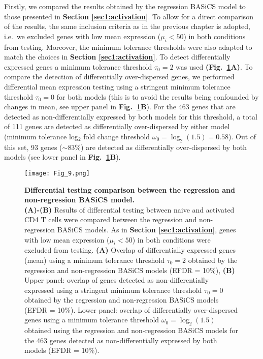 Firstly, we compared the results obtained by the regression BASiCS model to those presented in \textbf{Section \ref{sec1:activation}}.  
To allow for a direct comparison of the results, the same inclusion criteria as in the previous chapter is adopted, i.e.~we excluded genes with low mean expression ($\mu_i<50$) in both conditions from testing. Moreover, the minimum tolerance thresholds were also adapted to match the choices in \textbf{Section \ref{sec1:activation}}. To detect differentially expressed genes a minimum tolerance threshold $\tau_0 = 2$ was used \textbf{(Fig.~\ref{fig2:model_comparison}A)}. To compare the detection of differentially over-dispersed genes, we performed differential mean expression testing using a stringent minimum tolerance threshold $\tau_0 = 0$ for both models (this is to avoid the results being confounded by changes in mean, see upper panel in \textbf{Fig.~\ref{fig2:model_comparison}B}). For the 463 genes that are detected as non-differentially expressed by both models for this threshold, a total of 111 genes are detected as differentially over-dispersed by either model (minimum tolerance log$_2$ fold change threshold $\omega_0 = \log_2(1.5) = 0.58$). Out of this set, 93 genes ($\sim$83\%) are detected as differentially over-dispersed by both models (see lower panel in \textbf{Fig.~\ref{fig2:model_comparison}B}).

\begin{figure}[!h]
\centering
\texttt{[image: Fig\_9.png]}
\caption[Differential testing results of the regression and non-regression BASiCS model]{\textbf{Differential testing comparison between the regression and non-regression BASiCS model.}\\
\textbf{(A)-(B)} Results of differential testing between naive and activated CD4\plus{} T cells were compared between the regression and non-regression BASiCS models. As in \textbf{Section \ref{sec1:activation}}, genes with low mean expression ($\mu_i<50$) in both conditions were excluded from testing. \textbf{(A)} Overlap of differentially expressed genes (mean) using a minimum tolerance threshold $\tau_0=2$ obtained by the regression and non-regression BASiCS models (EFDR = 10\%), \textbf{(B)} Upper panel: overlap of genes detected as non-differentially expressed using a stringent minimum tolerance threshold $\tau_0=0$ obtained by the regression and non-regression BASiCS models (EFDR = 10\%). Lower panel: overlap of differentially over-dispersed genes using a minimum tolerance threshold $\omega_0=\log_2(1.5)$ obtained using the regression and non-regression  BASiCS models for the 463 genes detected as non-differentially expressed by both models (EFDR = 10\%).}
\label{fig2:model_comparison}
\end{figure}

